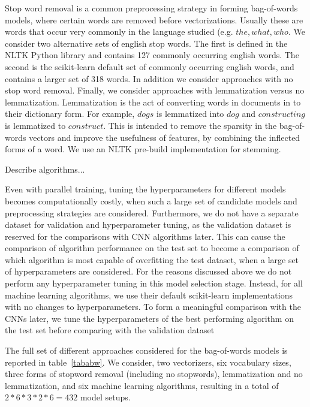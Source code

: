 \documentclass[conference]{IEEEtran}
\begin{document}
Stop word removal is a common preprocessing strategy in forming bag-of-words models, where certain words are removed before vectorizations. Usually these are words that occur very commonly in the language studied (e.g. $the, what, who$. We consider two alternative sets of english stop words. The first is defined in the NLTK \cite{nltk} Python library and contains 127 commonly occurring english words. The second is the scikit-learn \cite{scikit-learn} default set of commonly occurring english words, and contains a larger set of 318 words. In addition we consider approaches with no stop word removal. Finally, we consider approaches with lemmatization versus no lemmatization. Lemmatization is the act of converting words in documents in to their dictionary form. For example, $dogs$ is lemmatized into $dog$ and $constructing$ is lemmatized to $construct$. This is intended to remove the sparsity in the bag-of-words vectors and improve the usefulness of features, by combining the inflected forms of a word. We use an NLTK \cite{nltk} pre-build implementation for stemming.

Describe algorithms...

Even with parallel training, tuning the hyperparameters for different models becomes computationally costly, when such a large set of candidate models and preprocessing strategies are considered. Furthermore, we do not have a separate dataset for validation and hyperparameter tuning, as the validation dataset is reserved for the comparisons with CNN algorithms later. This can cause the comparison of algorithm performance on the test set to become a comparison of which algorithm is most capable of overfitting the test dataset, when a large set of hyperparameters are considered. For the reasons discussed above we do not perform any hyperparameter tuning in this model selection stage. Instead, for all machine learning algorithms, we use their default scikit-learn\cite{scikit-learn} implementations with no changes to hyperparameters. To form a meaningful comparison with the CNNs later, we tune the hyperparameters of the best performing algorithm on the test set before comparing with the validation dataset

The full set of different approaches considered for the bag-of-words models is reported in table~\ref{tababw}. We consider, two vectorizers, six vocabulary sizes, three forms of stopword removal (including no stopwords), lemmatization and no lemmatization, and six machine learning algorithms, resulting in a total of $2 * 6 * 3 * 2 * 6 = 432$ model setups.
\end{document}
